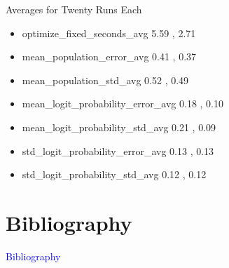 \documentclass{beamer}
\newcommand{\Blue}[1]{\textcolor{blue}{#1}}
\newcommand{\Section}[1]{
    \section{#1}
    \begin{frame}
    \begin{center}
    \Blue{ \Large{#1} }
    \end{center}
    \end{frame}
}
\begin{document}
\begin{frame}{Averages for Twenty Runs Each}
\begin{itemize}

\item
optimize\_fixed\_seconds\_avg
\hspace{2.3em} 5.59 , 2.71
\pause

\item
mean\_population\_error\_avg
\hspace{2.35em} 0.41 , 0.37
\pause

\item
mean\_population\_std\_avg
\hspace{3.05em} 0.52 , 0.49
\pause

\item
mean\_logit\_probability\_error\_avg
\hspace{0.2em} 0.18 , 0.10
\pause

\item
mean\_logit\_probability\_std\_avg
\hspace{0.9em} 0.21 , 0.09
\pause

\item
std\_logit\_probability\_error\_avg
\hspace{1.2em} 0.13 , 0.13
\pause

\item
std\_logit\_probability\_std\_avg
\hspace{1.85em} 0.12 , 0.12
\pause


\end{itemize}
\end{frame}

\Section{Bibliography}
%
{}

\end{document}
